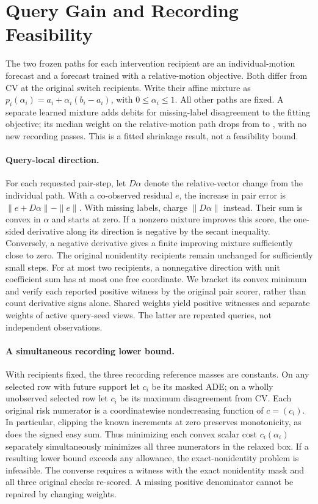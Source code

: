 \section{Query Gain and Recording Feasibility}
\label{sec:affine-feasibility}
The two frozen paths for each intervention recipient are an
individual-motion forecast and a forecast trained with a
relative-motion objective. Both differ from CV at the original
switch recipients. Write their affine mixture as
$p_i(\alpha_i)=a_i+\alpha_i(b_i-a_i)$, with $0\leq\alpha_i\leq1$.
All other paths are fixed. A separate learned mixture adds
debits for missing-label disagreement to the fitting objective;
its median weight on the relative-motion path drops from
\AlphaObserved{} to \AlphaCompletion{}, with no new recording
passes. This is a fitted shrinkage result, not a feasibility
bound.

\paragraph{Query-local direction.}
For each requested pair-step, let $D\alpha$ denote the
relative-vector change from the individual path. With a
co-observed residual $e$, the increase in pair error is
$\|e+D\alpha\|-\|e\|$. With missing labels, charge
$\|D\alpha\|$ instead. Their sum is convex in $\alpha$ and
starts at zero. If a nonzero mixture improves this score,
the one-sided derivative along its direction is negative
by the secant inequality. Conversely, a negative derivative
gives a finite improving mixture sufficiently close to zero.
The original nonidentity recipients remain unchanged for
sufficiently small steps. For at most two recipients, a
nonnegative direction with unit coefficient sum has at
most one free coordinate. We bracket its convex minimum
and verify each reported positive witness by the original
pair scorer, rather than count derivative signs alone.
Shared weights yield \PairShared{} positive witnesses and
separate weights \PairSeparate{} of \PairActive{} active
query-seed views. The latter are repeated queries, not
independent observations.

\paragraph{A simultaneous recording lower bound.}
With recipients fixed, the three recording reference masses
are constants. On any selected row with future support let
$c_i$ be its masked ADE; on a wholly unobserved selected row
let $c_i$ be its maximum disagreement from CV. Each original
risk numerator is a coordinatewise nondecreasing function
of $c=(c_i)$. In particular, clipping the known increments
at zero preserves monotonicity, as does the signed easy sum.
Thus minimizing each convex scalar cost $c_i(\alpha_i)$
separately simultaneously minimizes all three numerators
in the relaxed box. If a resulting lower bound exceeds
any allowance, the exact-nonidentity problem is infeasible.
The converse requires a witness with the exact nonidentity
mask and all three original checks re-scored. A missing
positive denominator cannot be repaired by changing weights.

